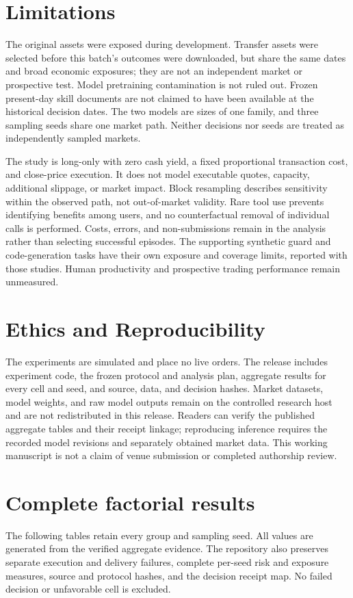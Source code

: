 \documentclass[11pt]{article}
\begin{document}
\section*{Limitations}
The original assets were exposed during development. Transfer assets were selected before
this batch's outcomes were downloaded, but share the same dates and broad economic
exposures; they are not an independent market or prospective test. Model pretraining
contamination is not ruled out. Frozen present-day skill documents are not claimed to
have been available at the historical decision dates. The two models are sizes of one
family, and three sampling seeds share one market path. Neither decisions nor seeds
are treated as independently sampled markets.

The study is long-only with zero cash yield, a fixed proportional transaction cost,
and close-price execution. It does not model executable quotes, capacity, additional
slippage, or market impact. Block resampling describes sensitivity within the observed
path, not out-of-market validity. Rare tool use prevents identifying benefits among
users, and no counterfactual removal of individual calls is performed. Costs, errors,
and non-submissions remain in the analysis rather than selecting successful episodes.
The supporting synthetic guard and code-generation tasks have their own exposure and
coverage limits, reported with those studies. Human productivity and prospective trading
performance remain unmeasured.

\section*{Ethics and Reproducibility}
The experiments are simulated and place no live orders. The release includes experiment
code, the frozen protocol and analysis plan, aggregate results for every cell and seed,
and source, data, and decision hashes. Market datasets, model weights, and raw model
outputs remain on the controlled research host and are not redistributed in this release.
Readers can verify the published aggregate tables and their receipt linkage; reproducing
inference requires the recorded model revisions and separately obtained market data.
This working manuscript is not a claim of venue submission or completed authorship review.


\clearpage
\appendix
\raggedbottom
\makeatletter
\setlength{\@fptop}{0pt}
\setlength{\@fpsep}{14pt}
\setlength{\@fpbot}{0pt plus 1fil}
\makeatother
\section{Complete factorial results}
\label{app:factorial}
The following tables retain every group and sampling seed. All values are generated from
the verified aggregate evidence. The repository also preserves separate execution and
delivery failures, complete per-seed risk and exposure measures, source and protocol hashes,
and the decision receipt map. No failed decision or unfavorable cell is excluded.

\clearpage
\end{document}
